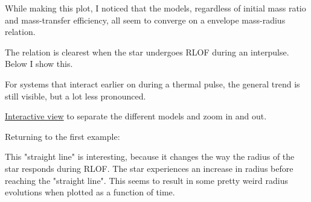 \documentclass[a4paper,10pt]{article}
\begin{document}
\begin{figure}[ht]
    \centering
\end{figure}

While making this plot, I noticed that the models, regardless of initial mass ratio and mass-transfer efficiency, all seem to converge on a envelope mass-radius relation.

The relation is clearest when the star undergoes RLOF during an interpulse. Below I show this.

\begin{figure}[ht]
    \centering
\end{figure}

For systems that interact earlier on during a thermal pulse, the general trend is still visible, but a lot less pronounced.

\href{https://s-koen.github.io/figures/#/plots/master-internship/w19/low-mass-radius}{Interactive view} to separate the different models and zoom in and out.

\begin{figure}[ht]
    \centering
\end{figure}

Returning to the first example: 

This "straight line" is interesting, because it changes the way the radius of the star responds during RLOF. The star experiences an increase in radius before reaching the "straight line". This seems to result in some pretty weird radius evolutions when plotted as a function of time.

\begin{figure}[ht]
    \centering
\end{figure}
\end{document}
